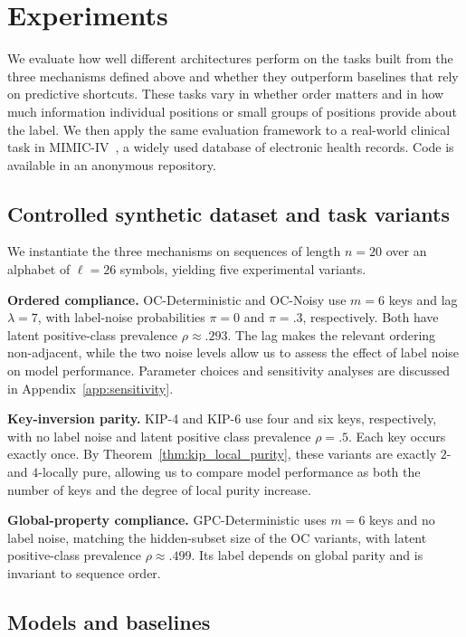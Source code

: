 \documentclass{article} %
\theoremstyle{plain}
\theoremstyle{definition}
\theoremstyle{remark}
\begin{document}
\section{Experiments}
\label{sec:experiments}
We evaluate how well different architectures perform on the tasks built from the three mechanisms defined above and whether they outperform baselines that rely on predictive shortcuts. These tasks vary in whether order matters and in how much information individual positions or small groups of positions provide about the label. We then apply the same evaluation framework to a real-world clinical task in MIMIC-IV~\citep{johnson2023mimiciv}, a widely used database of electronic health records. Code is available in an anonymous repository.

\subsection{Controlled synthetic dataset and task variants}
\label{sec:task_variants}

We instantiate the three mechanisms on sequences of length $n=20$ over an alphabet of $\ell=26$ symbols, yielding five experimental variants.

\textbf{Ordered compliance.}
OC-Deterministic and OC-Noisy use $m=6$ keys and lag $\lambda=7$, with label-noise probabilities $\pi=0$ and $\pi=.3$, respectively. Both have latent positive-class prevalence $\rho\approx .293$. The lag makes the relevant ordering non-adjacent, while the two noise levels allow us to assess the effect of label noise on model performance. Parameter choices and sensitivity analyses are discussed in Appendix~\ref{app:sensitivity}.

\textbf{Key-inversion parity.}
KIP-4 and KIP-6 use four and six keys, respectively, with no label noise and latent positive class prevalence $\rho=.5$. Each key occurs exactly once. By Theorem~\ref{thm:kip_local_purity}, these variants are exactly $2$- and $4$-locally pure, allowing us to compare model performance as both the number of keys and the degree of local purity increase.

\textbf{Global-property compliance.}
GPC-Deterministic uses $m=6$ keys and no label noise, matching the hidden-subset size of the OC variants, with latent positive-class prevalence $\rho\approx .499$. Its label depends on global parity and is invariant to sequence order.

\subsection{Models and baselines}
\label{subsec:models}
\end{document}
